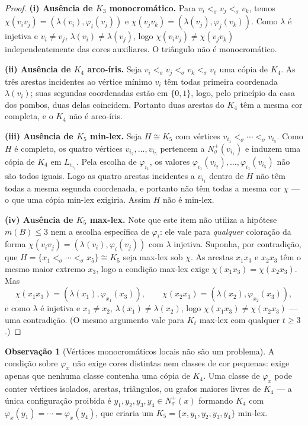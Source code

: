 \documentclass[reqno, 12pt]{amsart}
\numberwithin{equation}{section}
\theoremstyle{plain}
\theoremstyle{definition}
\newtheorem{remark}[theorem]{Observação}
\begin{document}
\begin{proof}
  \textbf{(i) Ausência de $K_3$ monocromático.}
  Para $v_i<_\sigma v_j<_\sigma v_k$, temos
  $\chi(v_iv_j)=(\lambda(v_i),\varphi_i(v_j))$ e
  $\chi(v_jv_k)=(\lambda(v_j),\varphi_j(v_k))$. Como $\lambda$ é
  injetiva e $v_i\neq v_j$, $\lambda(v_i)\neq\lambda(v_j)$, logo
  $\chi(v_iv_j)\neq\chi(v_jv_k)$ independentemente das cores
  auxiliares. O triângulo não é monocromático.

  \medskip
  \noindent\textbf{(ii) Ausência de $K_4$ arco-íris.}
  Seja $v_i<_\sigma v_j<_\sigma v_k<_\sigma v_\ell$ uma cópia de
  $K_4$. As três arestas incidentes ao vértice mínimo $v_i$ têm todas
  primeira coordenada $\lambda(v_i)$; suas segundas coordenadas estão
  em $\{0,1\}$, logo, pelo princípio da casa dos pombos, duas delas
  coincidem. Portanto duas arestas do $K_4$ têm a mesma cor completa,
  e o $K_4$ não é arco-íris.

  \medskip
  \noindent\textbf{(iii) Ausência de $K_5$ min-lex.}
  Seja $H\cong K_5$ com vértices
  $v_{i_1}<_\sigma\cdots<_\sigma v_{i_5}$. Como $H$ é completo, os
  quatro vértices $v_{i_2},\ldots,v_{i_5}$ pertencem a
  $N_\sigma^+(v_{i_1})$ e induzem uma cópia de $K_4$ em
  $L_{v_{i_1}}$. Pela escolha de $\varphi_{i_1}$, os valores
  $\varphi_{i_1}(v_{i_2}),\ldots,\varphi_{i_1}(v_{i_5})$ não são todos
  iguais. Logo as quatro arestas incidentes a $v_{i_1}$ dentro de $H$
  não têm todas a mesma segunda coordenada, e portanto não têm todas
  a mesma cor $\chi$ — o que uma cópia min-lex exigiria. Assim $H$
  não é min-lex.

  \medskip
  \noindent\textbf{(iv) Ausência de $K_5$ max-lex.}
  Note que este item não utiliza a hipótese $m(B)\leq 3$ nem a
  escolha específica de $\varphi_i$: ele vale para \emph{qualquer}
  coloração da forma $\chi(v_iv_j)=(\lambda(v_i),\varphi_i(v_j))$ com
  $\lambda$ injetiva.
  Suponha, por contradição, que $H=\{x_1<_\sigma\cdots<_\sigma
    x_5\}\cong K_5$ seja max-lex sob $\chi$. As arestas
  $x_1x_3$ e $x_2x_3$ têm o mesmo maior extremo $x_3$, logo a
  condição max-lex exige $\chi(x_1x_3)=\chi(x_2x_3)$. Mas
  \[
    \chi(x_1x_3)=(\lambda(x_1),\varphi_{x_1}(x_3)),\qquad
    \chi(x_2x_3)=(\lambda(x_2),\varphi_{x_2}(x_3)),
  \]
  e como $\lambda$ é injetiva e $x_1\neq x_2$,
  $\lambda(x_1)\neq\lambda(x_2)$, logo
  $\chi(x_1x_3)\neq\chi(x_2x_3)$ — uma contradição.
  (O mesmo argumento vale para $K_t$ max-lex com qualquer $t\geq 3$.)
\end{proof}

\begin{remark}[Vértices monocromáticos locais não são um problema]
  A condição sobre $\varphi_x$ não exige cores distintas nem classes
  de cor pequenas: exige apenas que nenhuma classe contenha uma
  cópia de $K_4$. Uma classe de $\varphi_x$ pode conter vértices
  isolados, arestas, triângulos, ou grafos maiores livres de $K_4$ —
  a única configuração proibida é $y_1,y_2,y_3,y_4\in N_\sigma^+(x)$
  formando $K_4$ com $\varphi_x(y_1)=\cdots=\varphi_x(y_4)$, que
  criaria um $K_5=\{x,y_1,y_2,y_3,y_4\}$ min-lex.
\end{remark}
\end{document}
